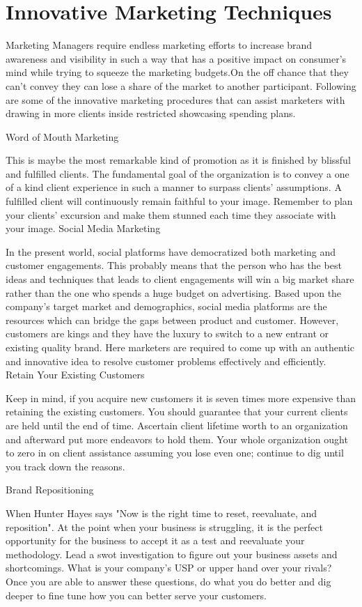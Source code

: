 \documentclass{article}
\begin{document}
\section{Innovative Marketing Techniques}

Marketing Managers require endless marketing efforts to increase brand awareness
and visibility in such a way that has a positive impact on consumer’s mind while trying
to squeeze the marketing budgets.On the off chance that they can't convey they can
lose a share of the market to another participant.
Following are some of the innovative marketing procedures that can assist marketers
with drawing in more clients inside restricted showcasing spending plans.

Word of Mouth Marketing

This is maybe the most remarkable kind of promotion as it is finished by blissful and
fulfilled clients. The fundamental goal of the organization is to convey a one of a kind
client experience in such a manner to surpass clients' assumptions. A fulfilled client will
continuously remain faithful to your image. Remember to plan your clients' excursion
and make them stunned each time they associate with your image.
Social Media Marketing

In the present world, social platforms have democratized both marketing and customer
engagements. This probably means that the person who has the best ideas and
techniques that leads to client engagements will win a big market share rather than the
one who spends a huge budget on advertising. Based upon the company’s target
market and demographics, social media platforms are the resources which can bridge
the gaps between product and customer. However, customers are kings and they have
the luxury to switch to a new entrant or existing quality brand. Here marketers are
required to come up with an authentic and innovative idea to resolve customer
problems effectively and efficiently.
Retain Your Existing Customers

Keep in mind, if you acquire new customers it is seven times more expensive than
retaining the existing customers. You should guarantee that your current clients are held
until the end of time. Ascertain client lifetime worth to an organization and afterward
put more endeavors to hold them. Your whole organization ought to zero in on client
assistance assuming you lose even one; continue to dig until you track down the
reasons.

Brand Repositioning

When Hunter Hayes says "Now is the right time to reset, reevaluate, and reposition". At
the point when your business is struggling, it is the perfect opportunity for the business
to accept it as a test and reevaluate your methodology. Lead a swot investigation to
figure out your business assets and shortcomings. What is your company's USP or
upper hand over your rivals? Once you are able to answer these questions, do what you
do better and dig deeper to fine tune how you can better serve your customers.
\end{document}
